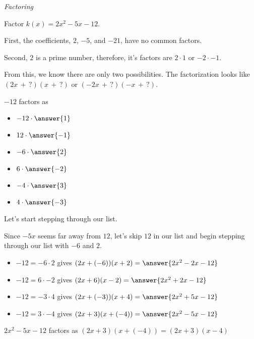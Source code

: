\documentclass{ximera}
\begin{document}
\begin{example} \textit{Factoring}

Factor $k(x) = 2 x^2 - 5 x - 12$.


\begin{explanation}

First, the coefficients, $2$, $-5$, and $-21$, have no common factors.


Second, $2$ is a prime number, therefore, it's factors are $2 \cdot 1$ or $-2 \cdot -1$.

From this, we know there are only two possibilities. The factorization looks like $(2 x \, + \, ?) (x \, + \, ?)$ or $(-2 x \, + \, ?) (-x \, + \, ?)$.






$-12$ factors as 
\begin{itemize}
\item $-12 \cdot \answer{1}$
\item $12 \cdot \answer{-1}$
\item $-6 \cdot \answer{2}$
\item $6 \cdot \answer{-2}$
\item $-4 \cdot \answer{3}$
\item $4 \cdot \answer{-3}$  
\end{itemize}



Let's start stepping through our list.

Since $-5 x$ seems far away from $12$, let's skip $12$ in our list and begin stepping through our list with $-6$ and $2$.

\begin{itemize}

\item $-12 = -6 \cdot 2$ gives $(2 x + (-6)) (x + 2) = \answer{2 x^2 - 2 x - 12}$
\item $-12 = 6 \cdot -2$ gives $(2 x + 6) (x - 2) = \answer{2 x^2 + 2 x -12}$
\item $-12 = -3 \cdot 4$ gives $(2 x + (-3)) (x + 4) = \answer{2 x^2 + 5 x - 12}$
\item $-12 = 3 \cdot -4$ gives $(2 x + 3) (x + (-4)) = \answer{2 x^2 - 5 x -12}$
\end{itemize}

$2 x^2 - 5 x - 12$ factors as $(2 x + 3) (x + (-4)) = (2 x + 3)(x - 4)$


\end{explanation}
\end{example}
\end{document}

